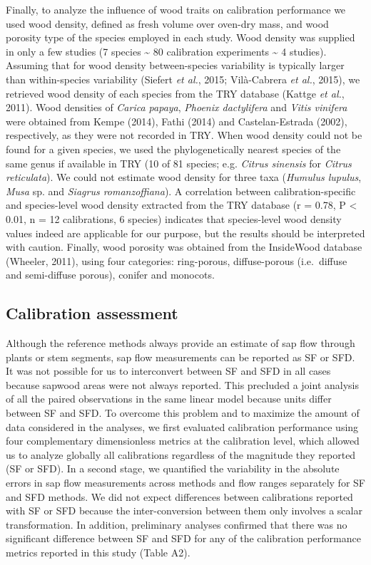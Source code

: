 \documentclass[11pt,twoside]{reedthesis}
\begin{document}
Finally, to analyze the influence of wood traits on calibration
performance we used wood density, defined as fresh volume over oven-dry
mass, and wood porosity type of the species employed in each study. Wood
density was supplied in only a few studies (7 species \textasciitilde{}
80 calibration experiments \textasciitilde{} 4 studies). Assuming that
for wood density between-species variability is typically larger than
within-species variability (Siefert \emph{et al.}, 2015; Vilà-Cabrera
\emph{et al.}, 2015), we retrieved wood density of each species from the
TRY database (Kattge \emph{et al.}, 2011). Wood densities of
\emph{Carica papaya}, \emph{Phoenix dactylifera} and \emph{Vitis
vinifera} were obtained from Kempe (2014), Fathi (2014) and
Castelan-Estrada (2002), respectively, as they were not recorded in TRY.
When wood density could not be found for a given species, we used the
phylogenetically nearest species of the same genus if available in TRY
(10 of 81 species; e.g. \emph{Citrus sinensis} for \emph{Citrus
reticulata}). We could not estimate wood density for three taxa
(\emph{Humulus lupulus}, \emph{Musa} sp. and \emph{Siagrus
romanzoffiana}). A correlation between calibration-specific and
species-level wood density extracted from the TRY database (r = 0.78, P
\textless{} 0.01, n = 12 calibrations, 6 species) indicates that
species-level wood density values indeed are applicable for our purpose,
but the results should be interpreted with caution. Finally, wood
porosity was obtained from the InsideWood database (Wheeler, 2011),
using four categories: ring-porous, diffuse-porous (i.e.~diffuse and
semi-diffuse porous), conifer and monocots.\par

\subsection{Calibration assessment}\label{calibration-assessment}

Although the reference methods always provide an estimate of sap flow
through plants or stem segments, sap flow measurements can be reported
as SF or SFD. It was not possible for us to interconvert between SF and
SFD in all cases because sapwood areas were not always reported. This
precluded a joint analysis of all the paired observations in the same
linear model because units differ between SF and SFD. To overcome this
problem and to maximize the amount of data considered in the analyses,
we first evaluated calibration performance using four complementary
dimensionless metrics at the calibration level, which allowed us to
analyze globally all calibrations regardless of the magnitude they
reported (SF or SFD). In a second stage, we quantified the variability
in the absolute errors in sap flow measurements across methods and flow
ranges separately for SF and SFD methods. We did not expect differences
between calibrations reported with SF or SFD because the
inter-conversion between them only involves a scalar transformation. In
addition, preliminary analyses confirmed that there was no significant
difference between SF and SFD for any of the calibration performance
metrics reported in this study (Table A2).\par
\end{document}
